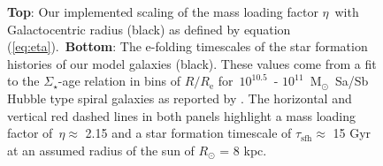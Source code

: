\documentclass[fleqn, usenatbib]{mnras}
\newcommand{\refp}[1]{(\ref{#1})}
\begin{document}
\begin{figure}
\caption{\textbf{Top}: Our implemented scaling of the mass loading factor 
$\eta$~with Galactocentric radius (black) as defined by equation 
\refp{eq:eta}.~\textbf{Bottom}: The e-folding timescales of the star formation 
histories of our model galaxies (black). These values come from a fit to the 
$\Sigma_\star$-age relation in bins of $R/R_\text{e}$ for~$10^{10.5}$~- 
$10^{11}$~M$_\odot$~Sa/Sb Hubble type spiral galaxies as reported by 
\citet[][see discussion in~\S~\ref{sec:methods:sfhs}]{Sanchez2020}. The 
horizontal and vertical red dashed lines in both panels highlight a mass 
loading factor of~$\eta \approx$ 2.15 and a star formation timescale of 
$\tau_\text{sfh} \approx$ 15 Gyr at an assumed radius of the sun of 
$R_\odot$ = 8 kpc. 
} 
\label{fig:eta_tau_sfh} 
\end{figure} 
\end{document}
